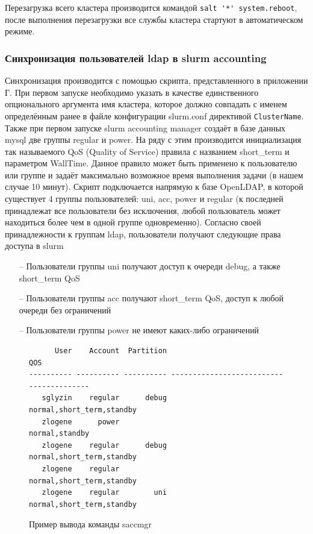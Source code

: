 \documentclass[a4paper]{extarticle}
\begin{document}
Перезагрузка всего кластера производится командой \verb|salt '*' system.reboot|, после выполнения перезагрузки все службы кластера стартуют в автоматическом режиме.

\subsubsection{Синхронизация пользователей ldap в slurm accounting}

Синхронизация производится с помощью скрипта, представленного в приложении Г. При первом запуске необходимо указать в качестве единственного опционального аргумента имя кластера, которое должно совпадать с именем определённым ранее в файле конфигурации slurm.conf директивой \texttt{ClusterName}. Также при первом запуске slurm accounting manager создаёт в базе данных mysql две группы regular и power. На ряду с этим производится инициализация так называемого QoS (Quality of Service) правила с названием short\_term и параметром WallTime. Данное правило может быть применено к пользователю или группе и задаёт максимально возможное время выполнения задачи (в нашем случае 10 минут). Скрипт подключается напрямую к базе OpenLDAP, в которой существует 4 группы пользователей: uni, acc, power и regular (к последней принадлежат все пользователи без исключения, любой пользователь может находиться более чем в одной группе одновременно). Согласно своей принадлежности к группам ldap, пользователи получают следующие права доступа в  slurm

\begin{itemize}
\item[--] Пользователи группы uni получают доступ к очереди debug, а также short\_term QoS
\item[--] Пользователи группы acc получают short\_term QoS, доступ к любой очереди без ограничений
\item[--] Пользователи группы power не имеют каких-либо ограничений
\end{itemize}

\begin{figure}[H]
\centering
\begin{verbatim}
      User    Account  Partition                                      QOS 
---------- ---------- ---------- ---------------------------------------- 
   sglyzin    regular      debug                normal,short_term,standby 
   zlogene      power                                      normal,standby 
   zlogene    regular      debug                normal,short_term,standby 
   zlogene    regular                           normal,short_term,standby 
   zlogene    regular        uni                normal,short_term,standby 
\end{verbatim}
\captionsetup{labelfont=bf, labelsep=space}
\caption{Пример вывода команды saccmgr}
\label{fig:saccmgr}
\end{figure} 
\end{document}

